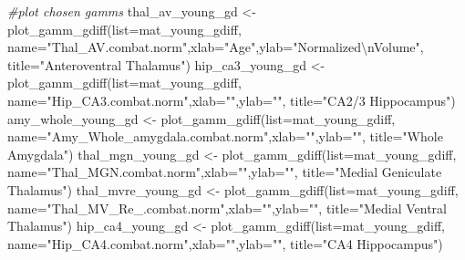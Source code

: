 \documentclass[
]{article}
\newenvironment{Shaded}{\begin{snugshade}}{\end{snugshade}}
\newcommand{\AttributeTok}[1]{\textcolor[rgb]{0.77,0.63,0.00}{#1}}
\newcommand{\CommentTok}[1]{\textcolor[rgb]{0.56,0.35,0.01}{\textit{#1}}}
\newcommand{\FunctionTok}[1]{\textcolor[rgb]{0.00,0.00,0.00}{#1}}
\newcommand{\NormalTok}[1]{#1}
\newcommand{\OtherTok}[1]{\textcolor[rgb]{0.56,0.35,0.01}{#1}}
\newcommand{\SpecialCharTok}[1]{\textcolor[rgb]{0.00,0.00,0.00}{#1}}
\newcommand{\StringTok}[1]{\textcolor[rgb]{0.31,0.60,0.02}{#1}}
\begin{document}
\begin{Shaded}
\begin{Highlighting}[]
\CommentTok{\#plot chosen gamms}
\NormalTok{thal\_av\_young\_gd }\OtherTok{\textless{}{-}} \FunctionTok{plot\_gamm\_gdiff}\NormalTok{(}\AttributeTok{list=}\NormalTok{mat\_young\_gdiff, }\AttributeTok{name=}\StringTok{"Thal\_AV.combat.norm"}\NormalTok{,}\AttributeTok{xlab=}\StringTok{"Age"}\NormalTok{,}\AttributeTok{ylab=}\StringTok{"Normalized}\SpecialCharTok{\textbackslash{}n}\StringTok{Volume"}\NormalTok{, }\AttributeTok{title=}\StringTok{"Anteroventral Thalamus"}\NormalTok{)}
\NormalTok{hip\_ca3\_young\_gd }\OtherTok{\textless{}{-}} \FunctionTok{plot\_gamm\_gdiff}\NormalTok{(}\AttributeTok{list=}\NormalTok{mat\_young\_gdiff, }\AttributeTok{name=}\StringTok{"Hip\_CA3.combat.norm"}\NormalTok{,}\AttributeTok{xlab=}\StringTok{""}\NormalTok{,}\AttributeTok{ylab=}\StringTok{""}\NormalTok{, }\AttributeTok{title=}\StringTok{"CA2/3 Hippocampus"}\NormalTok{)}
\NormalTok{amy\_whole\_young\_gd }\OtherTok{\textless{}{-}} \FunctionTok{plot\_gamm\_gdiff}\NormalTok{(}\AttributeTok{list=}\NormalTok{mat\_young\_gdiff, }\AttributeTok{name=}\StringTok{"Amy\_Whole\_amygdala.combat.norm"}\NormalTok{,}\AttributeTok{xlab=}\StringTok{""}\NormalTok{,}\AttributeTok{ylab=}\StringTok{""}\NormalTok{, }\AttributeTok{title=}\StringTok{"Whole Amygdala"}\NormalTok{)}
\NormalTok{thal\_mgn\_young\_gd }\OtherTok{\textless{}{-}} \FunctionTok{plot\_gamm\_gdiff}\NormalTok{(}\AttributeTok{list=}\NormalTok{mat\_young\_gdiff, }\AttributeTok{name=}\StringTok{"Thal\_MGN.combat.norm"}\NormalTok{,}\AttributeTok{xlab=}\StringTok{""}\NormalTok{,}\AttributeTok{ylab=}\StringTok{""}\NormalTok{, }\AttributeTok{title=}\StringTok{"Medial Geniculate Thalamus"}\NormalTok{)}
\NormalTok{thal\_mvre\_young\_gd }\OtherTok{\textless{}{-}} \FunctionTok{plot\_gamm\_gdiff}\NormalTok{(}\AttributeTok{list=}\NormalTok{mat\_young\_gdiff, }\AttributeTok{name=}\StringTok{"Thal\_MV\_Re\_.combat.norm"}\NormalTok{,}\AttributeTok{xlab=}\StringTok{""}\NormalTok{,}\AttributeTok{ylab=}\StringTok{""}\NormalTok{, }\AttributeTok{title=}\StringTok{"Medial Ventral Thalamus"}\NormalTok{)}
\NormalTok{hip\_ca4\_young\_gd }\OtherTok{\textless{}{-}} \FunctionTok{plot\_gamm\_gdiff}\NormalTok{(}\AttributeTok{list=}\NormalTok{mat\_young\_gdiff, }\AttributeTok{name=}\StringTok{"Hip\_CA4.combat.norm"}\NormalTok{,}\AttributeTok{xlab=}\StringTok{""}\NormalTok{,}\AttributeTok{ylab=}\StringTok{""}\NormalTok{, }\AttributeTok{title=}\StringTok{"CA4 Hippocampus"}\NormalTok{)}


\end{Highlighting}
\end{Shaded}
\end{document}
